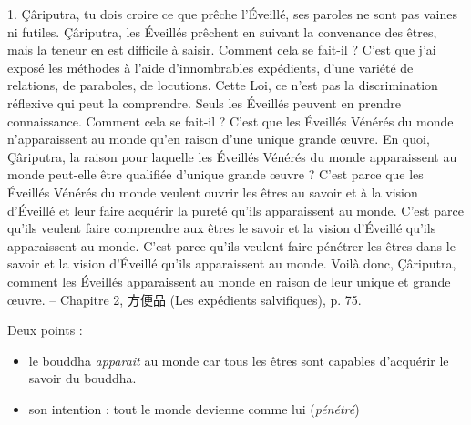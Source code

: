 \begin{singlequote}
    1.	Çâriputra, tu dois croire ce que prêche l’Éveillé, ses paroles ne sont pas vaines ni futiles. Çâriputra, les Éveillés prêchent en suivant la convenance des êtres, mais la teneur en est difficile à saisir. Comment cela se fait-il ? C’est que j’ai exposé les méthodes à l’aide d’innombrables expédients, d’une variété de relations, de paraboles, de locutions. Cette Loi, ce n’est pas la discrimination réflexive qui peut la comprendre. Seuls les Éveillés peuvent en prendre connaissance. Comment cela se fait-il ? C’est que les Éveillés Vénérés du monde n’apparaissent au monde qu’en raison d’une unique grande œuvre. En quoi, Çâriputra, la raison pour laquelle les Éveillés Vénérés du monde apparaissent au monde peut-elle être qualifiée d’unique grande œuvre ?
C’est parce que les Éveillés Vénérés du monde veulent ouvrir les êtres au savoir et à la vision d’Éveillé et leur faire acquérir la pureté qu’ils apparaissent au monde.
C’est parce qu’ils veulent faire comprendre aux êtres le savoir et la vision d’Éveillé qu’ils apparaissent au monde.
C’est parce qu’ils veulent faire pénétrer les êtres dans le savoir et la vision d’Éveillé qu’ils apparaissent au monde.
Voilà donc, Çâriputra, comment les Éveillés apparaissent au monde en raison de leur unique et grande œuvre.
-- Chapitre 2, 方便品 (Les expédients salvifiques), p. 75.
\end{singlequote}

Deux points : 
\begin{itemize}
    \item le bouddha \textit{apparait} au monde car tous les êtres sont capables d'acquérir le savoir du bouddha.
    \item son intention : tout le monde devienne comme lui (\textit{pénétré})
\end{itemize}

